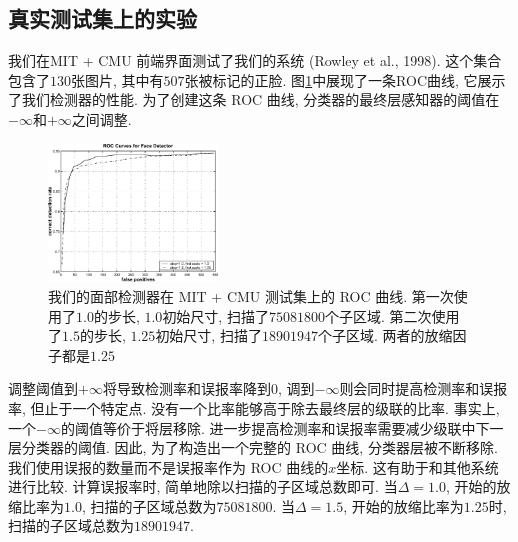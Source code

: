 \documentclass[a4paper,utf8,11pt, onecolumn]{ctexart}
\begin{document}
\subsection{真实测试集上的实验}
我们在MIT + CMU 前端界面测试了我们的系统 (Rowley et al., 1998). 这个集合包含了$130$张图片, 其中有$507$张被标记的正脸. 图\ref{fig:step_dif}中展现了一条ROC曲线, 它展示了我们检测器的性能. 为了创建这条 ROC 曲线, 分类器的最终层感知器的阈值在$-\infty$和$+\infty$之间调整. 
\begin{figure}[!b]
\centering
\includegraphics[width=0.4\textwidth]{step_dif.png}
\caption{我们的面部检测器在 MIT + CMU 测试集上的 ROC 曲线. 第一次使用了$1.0$的步长, $1.0$初始尺寸, 扫描了$75081800$个子区域. 第二次使用了$1.5$的步长, $1.25$初始尺寸, 扫描了$18901947$个子区域. 两者的放缩因子都是$1.25$}
\label{fig:step_dif}
\end{figure}
调整阈值到$+\infty$将导致检测率和误报率降到0, 调到$-\infty$则会同时提高检测率和误报率, 但止于一个特定点. 没有一个比率能够高于除去最终层的级联的比率.
事实上, 一个$-\infty$的阈值等价于将层移除. 进一步提高检测率和误报率需要减少级联中下一层分类器的阈值. 因此, 为了构造出一个完整的 ROC 曲线, 分类器层被不断移除.
我们使用误报的数量而不是误报率作为 ROC 曲线的$x$坐标. 这有助于和其他系统进行比较. 计算误报率时, 简单地除以扫描的子区域总数即可.
当$\Delta=1.0$, 开始的放缩比率为$1.0$, 扫描的子区域总数为$75081800$. 当$\Delta=1.5$, 开始的放缩比率为$1.25$时, 扫描的子区域总数为$18901947$.
\end{document}
